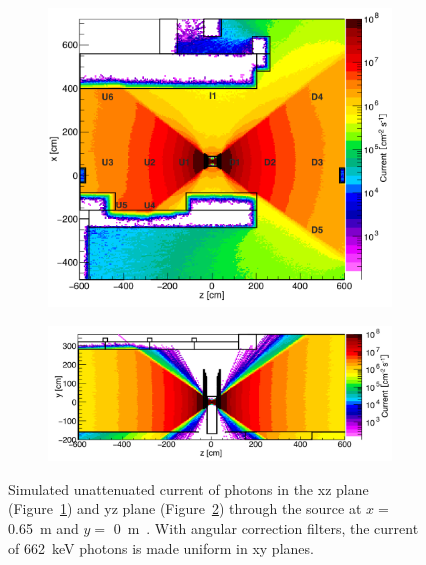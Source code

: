 	\begin{figure}[H]
		\begin{subfigure}{0.5\linewidth}
		    \centering
			\includegraphics[width = 0.6\plotwidth]{fig/chapt5/GIFpp-gCurrent-XZ.png}\\
			\caption{\label{fig:GIFpp-gCurrent:XZ}}
		\end{subfigure}
		\begin{subfigure}{0.5\linewidth}
		    \centering
			\includegraphics[width = 0.6\plotwidth]{fig/chapt5/GIFpp-gCurrent-YZ.png}
			\caption{\label{fig:GIFpp-gCurrent:YZ}}
		\end{subfigure}
		\caption{\label{fig:GIFpp-gCurrent} Simulated unattenuated current of photons in the xz plane (Figure~\ref{fig:GIFpp-gCurrent:XZ}) and yz plane (Figure~\ref{fig:GIFpp-gCurrent:YZ}) through the source at $x=$ \SI{0.65}{m} and $y=$ \SI{0}{m}~\cite{PFEIFFER2017}. With angular correction filters, the current of \SI{662}{keV} photons is made uniform in xy planes.}
    \end{figure}
	
